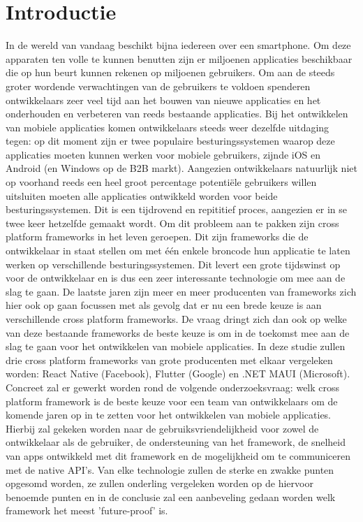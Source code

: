 
\section{Introductie} %
\label{sec:introductie}

In de wereld van vandaag beschikt bijna iedereen over een smartphone. Om deze apparaten ten volle te kunnen benutten zijn er miljoenen applicaties beschikbaar die op hun beurt kunnen rekenen op miljoenen gebruikers. Om aan de steeds groter wordende verwachtingen van de gebruikers te voldoen spenderen ontwikkelaars zeer veel tijd aan het bouwen van nieuwe applicaties en het onderhouden en verbeteren van reeds bestaande applicaties. Bij het ontwikkelen van mobiele applicaties komen ontwikkelaars steeds weer dezelfde uitdaging tegen: op dit moment zijn er twee populaire besturingssystemen waarop deze applicaties moeten kunnen werken voor mobiele gebruikers, zijnde iOS en Android (en Windows op de B2B markt). Aangezien ontwikkelaars natuurlijk niet op voorhand reeds een heel groot percentage potentiële gebruikers willen uitsluiten moeten alle applicaties ontwikkeld worden voor beide besturingssystemen. Dit is een tijdrovend en repititief proces, aangezien er in se twee keer hetzelfde gemaakt wordt. Om dit probleem aan te pakken zijn cross platform frameworks in het leven geroepen. Dit zijn frameworks die de ontwikkelaar in staat stellen om met één enkele broncode hun applicatie te laten werken op verschillende besturingssystemen. Dit levert een grote tijdswinst op voor de ontwikkelaar en is dus een zeer interessante technologie om mee aan de slag te gaan. De laatste jaren zijn meer en meer producenten van frameworks zich hier ook op gaan focussen met als gevolg dat er nu een brede keuze is aan verschillende cross platform frameworks. De vraag dringt zich dan ook op welke van deze bestaande frameworks de beste keuze is om in de toekomst mee aan de slag te gaan voor het ontwikkelen van mobiele applicaties. In deze studie zullen drie cross platform frameworks van grote producenten met elkaar vergeleken worden: React Native (Facebook), Flutter (Google) en .NET MAUI (Microsoft). Concreet zal er gewerkt worden rond de volgende onderzoeksvraag: welk cross platform framework is de beste keuze voor een team van ontwikkelaars om de komende jaren op in te zetten voor het ontwikkelen van mobiele applicaties. Hierbij zal gekeken worden naar de gebruiksvriendelijkheid voor zowel de ontwikkelaar als de gebruiker, de ondersteuning van het framework, de snelheid van apps ontwikkeld met dit framework en de mogelijkheid om te communiceren met de native API's. Van elke technologie zullen de sterke en zwakke punten opgesomd worden, ze zullen onderling vergeleken worden op de hiervoor benoemde punten en in de conclusie zal een aanbeveling gedaan worden welk framework het meest 'future-proof' is. 

